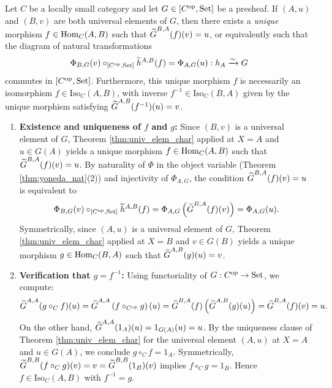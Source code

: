 \documentclass[10pt,a4paper]{article}
\begin{document}
\begin{theorem}\label{thm:rep_unique}
Let $C$ be a locally small category and let $G \in [C^{\textrm{op}}, {\textrm{Set}}]$ be a presheaf. If $(A, u)$ and $(B, v)$ are both universal elements of $G$, then there exists a \emph{unique} morphism $f \in {\textrm{Hom}}_C(A, B)$ such that ${\widetilde{G}\textrm{}}^{B,A}(f)(v) = u$, or equivalently such that the diagram of natural transformations
$$\Phi_{B,G}(v) \circ_{[C^{\textrm{op}},{\textrm{Set}}]} \widetilde{h}^{A,B}(f) = \Phi_{A,G}(u) : h_A \xrightarrow{\sim} G$$
commutes in $[C^{\textrm{op}}, {\textrm{Set}}]$. Furthermore, this unique morphism $f$ is necessarily an isomorphism $f \in \mathrm{Iso}_C(A, B)$, with inverse $f^{-1} \in \mathrm{Iso}_C(B, A)$ given by the unique morphism satisfying ${\widetilde{G}\textrm{}}^{A,B}(f^{-1})(u) = v$.
\end{theorem}
\myprf
\begin{enumerate}
\item \textbf{Existence and uniqueness of $f$ and $g$:} Since $(B, v)$ is a universal element of $G$, Theorem \ref{thm:univ_elem_char} applied at $X = A$ and $u \in G(A)$ yields a unique morphism $f \in {\textrm{Hom}}_C(A, B)$ such that ${\widetilde{G}\textrm{}}^{B,A}(f)(v) = u$. By naturality of $\Phi$ in the object variable (Theorem \ref{thm:yoneda_nat}(2)) and injectivity of $\Phi_{A,G}$, the condition ${\widetilde{G}\textrm{}}^{B,A}(f)(v) = u$ is equivalent to
$$\Phi_{B,G}(v) \circ_{[C^{\textrm{op}},{\textrm{Set}}]} \widetilde{h}^{A,B}(f) = \Phi_{A,G}\left({\widetilde{G}\textrm{}}^{B,A}(f)(v)\right) = \Phi_{A,G}(u).$$
Symmetrically, since $(A, u)$ is a universal element of $G$, Theorem \ref{thm:univ_elem_char} applied at $X = B$ and $v \in G(B)$ yields a unique morphism $g \in {\textrm{Hom}}_C(B, A)$ such that ${\widetilde{G}\textrm{}}^{A,B}(g)(u) = v$.
\item \textbf{Verification that $g = f^{-1}$:} Using functoriality of $G : C^{\textrm{op}} \to {\textrm{Set}}$, we compute:
$${\widetilde{G}\textrm{}}^{A,A}(g \circ_C f)(u) = {\widetilde{G}\textrm{}}^{A,A}\left(f \circ_{C^{\textrm{op}}} g\right)(u) = {\widetilde{G}\textrm{}}^{B,A}(f)\left({\widetilde{G}\textrm{}}^{A,B}(g)(u)\right) = {\widetilde{G}\textrm{}}^{B,A}(f)(v) = u.$$
On the other hand, ${\widetilde{G}\textrm{}}^{A,A}(1_A)(u) = 1_{G(A)}(u) = u$. By the uniqueness clause of Theorem \ref{thm:univ_elem_char} for the universal element $(A, u)$ at $X = A$ and $u \in G(A)$, we conclude $g \circ_C f = 1_A$. Symmetrically, ${\widetilde{G}\textrm{}}^{B,B}(f \circ_C g)(v) = v = {\widetilde{G}\textrm{}}^{B,B}(1_B)(v)$ implies $f \circ_C g = 1_B$. Hence $f \in \mathrm{Iso}_C(A, B)$ with $f^{-1} = g$.
\end{enumerate}
\myqed
\end{document}
